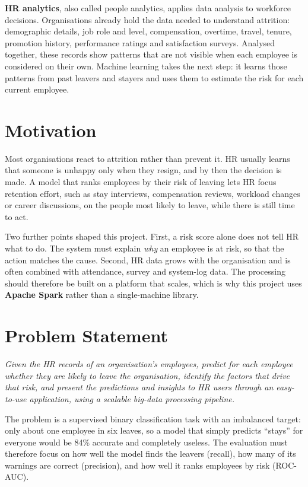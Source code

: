 \documentclass[12pt,a4paper]{report}
\begin{document}
\textbf{HR analytics}, also called people analytics, applies data analysis to workforce decisions. Organisations already hold the data needed to understand attrition: demographic details, job role and level, compensation, overtime, travel, tenure, promotion history, performance ratings and satisfaction surveys. Analysed together, these records show patterns that are not visible when each employee is considered on their own. Machine learning takes the next step: it learns those patterns from past leavers and stayers and uses them to estimate the risk for each current employee.

\section{Motivation}

Most organisations react to attrition rather than prevent it. HR usually learns that someone is unhappy only when they resign, and by then the decision is made. A model that ranks employees by their risk of leaving lets HR focus retention effort, such as stay interviews, compensation reviews, workload changes or career discussions, on the people most likely to leave, while there is still time to act.

Two further points shaped this project. First, a risk score alone does not tell HR what to do. The system must explain \emph{why} an employee is at risk, so that the action matches the cause. Second, HR data grows with the organisation and is often combined with attendance, survey and system-log data. The processing should therefore be built on a platform that scales, which is why this project uses \textbf{Apache Spark} rather than a single-machine library.

\section{Problem Statement}

\textit{Given the HR records of an organisation's employees, predict for each employee whether they are likely to leave the organisation, identify the factors that drive that risk, and present the predictions and insights to HR users through an easy-to-use application, using a scalable big-data processing pipeline.}

The problem is a supervised binary classification task with an imbalanced target: only about one employee in six leaves, so a model that simply predicts ``stays'' for everyone would be 84\% accurate and completely useless. The evaluation must therefore focus on how well the model finds the leavers (recall), how many of its warnings are correct (precision), and how well it ranks employees by risk (ROC-AUC).
\end{document}
